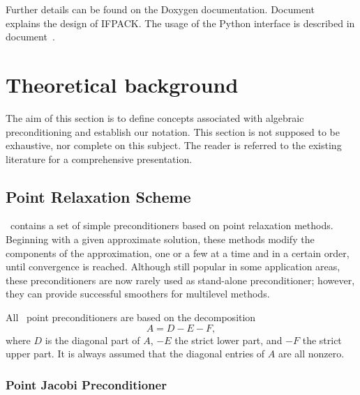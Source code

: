 Further details can be found on the Doxygen
  documentation. Document~\cite{ifpack-design} explains the design of IFPACK.
  The usage of the Python interface is described in
  document~\cite{pytrilinos-tutorial}.

\section{Theoretical background}
\label{sec:theo}

The aim of this section is to define concepts associated with algebraic
preconditioning and establish our notation. This section is not
supposed to be exhaustive, nor complete on this subject. The reader is
referred to the existing literature for a comprehensive presentation.

\subsection{Point Relaxation Scheme}
\label{sec:point}

\ifpack\ contains a set of simple preconditioners based on point relaxation
methods.
Beginning with a given approximate solution, these methods modify the
components of the approximation, one or a few at a time and in a certain order,
until convergence is reached. Although still popular in some application
areas, these preconditioners are now
rarely used as stand-alone preconditioner; however, they can provide successful smoothers for multilevel
methods. 

All \ifpack\ point preconditioners are based on the decomposition
\begin{equation}
\label{eq:splitting}
A = D - E - F,
\end{equation}
where $D$ is the diagonal part of $A$, $-E$ the strict lower part, and 
$-F$ the strict upper part. It is always assumed that the diagonal entries of
$A$ are all nonzero.

\subsubsection{Point Jacobi Preconditioner}
\label{sec:jacobi}

